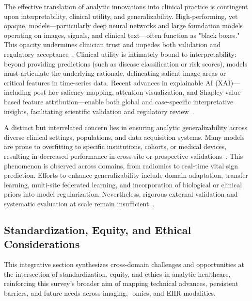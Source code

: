 \documentclass[sigconf]{acmart}
\begin{document}
The effective translation of analytic innovations into clinical practice is contingent upon interpretability, clinical utility, and generalizability. High-performing, yet opaque, models—particularly deep neural networks and large foundation models operating on images, signals, and clinical text—often function as "black boxes." This opacity undermines clinician trust and impedes both validation and regulatory acceptance~\cite{ref11, ref32, ref36, ref39, ref46, ref50, ref53, ref54, ref65, ref68, ref70, ref72, ref73, ref78, ref80, ref87, ref90, ref98, ref99, ref106}. Clinical utility is intimately bound to interpretability: beyond providing predictions (such as disease classification or risk scores), models must articulate the underlying rationale, delineating salient image areas or critical features in time-series data. Recent advances in explainable AI (XAI)—including post-hoc saliency mapping, attention visualization, and Shapley value-based feature attribution—enable both global and case-specific interpretative insights, facilitating scientific validation and regulatory review~\cite{ref11, ref36, ref54, ref72, ref78, ref80, ref98, ref99}.

A distinct but interrelated concern lies in ensuring analytic generalizability across diverse clinical settings, populations, and data acquisition systems. Many models are prone to overfitting to specific institutions, cohorts, or medical devices, resulting in decreased performance in cross-site or prospective validations~\cite{ref28, ref32, ref53, ref65, ref73, ref98, ref106}. This phenomenon is observed across domains, from radiomics to real-time vital sign prediction. Efforts to enhance generalizability include domain adaptation, transfer learning, multi-site federated learning, and incorporation of biological or clinical priors into model regularization. Nevertheless, rigorous external validation and systematic evaluation at scale remain insufficient~\cite{ref28, ref70, ref73, ref78, ref80, ref98, ref99, ref106}.

\subsection{Standardization, Equity, and Ethical Considerations}

This integrative section synthesizes cross-domain challenges and opportunities at the intersection of standardization, equity, and ethics in analytic healthcare, reinforcing this survey's broader aim of mapping technical advances, persistent barriers, and future needs across imaging, -omics, and EHR modalities.
\end{document}
